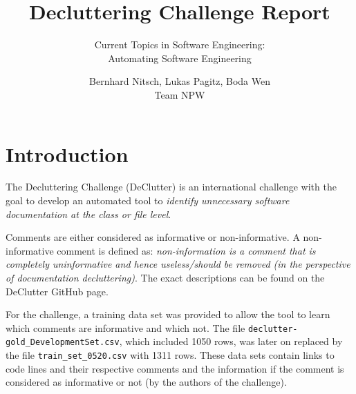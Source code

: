 \documentclass[runningheads]{llncs}
\begin{document}
\sloppy
%
\title{Decluttering Challenge Report}
\subtitle{Current Topics in Software Engineering:\\
Automating Software Engineering}
%
%
\author{Bernhard Nitsch, Lukas Pagitz, Boda Wen\\
Team NPW}
%
\authorrunning{ }
%
%
\maketitle
%
%


\section{Introduction}
The Decluttering Challenge (DeClutter) is an international challenge with the goal to develop an automated tool to \textit{identify unnecessary software documentation at the class or file level}. \cite{ref_declutter}

Comments are either considered as informative or non-informative. A non-informative comment is defined as: \textit{non-information is a comment that is completely uninformative and hence useless/should be removed (in the perspective of documentation decluttering)}.
The exact descriptions can be found on the DeClutter GitHub page.

For the challenge, a training data set was provided to allow the tool to learn which comments are informative and which not. The file \texttt{declutter-gold\_DevelopmentSet.csv}, which included 1050 rows, was later on replaced by the file \texttt{train\_set\_0520.csv} with 1311 rows. 
These data sets contain links to code lines and their respective comments and the information if the comment is considered as informative or not (by the authors of the challenge).

\end{document}
